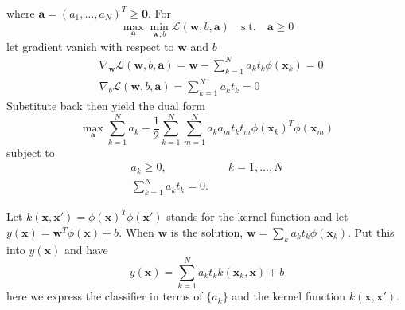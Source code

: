 \documentclass[../main.tex]{subfiles}
\begin{document}
        where $\mathbf{a}=(a_1,\dots,a_N)^T\geq \mathbf{0}$. For
        \[
            \max_{\mathbf{a}}\min_{\mathbf{w},b}\mathcal{L}(\mathbf{w},b,\mathbf{a})\mathrm{\quad s.t. \quad}\mathbf{a}\geq 0
        \]
        let gradient vanish with respect to $\mathbf{w}$ and $b$
        \begin{align*}
            &\nabla_{\mathbf{w}}\mathcal{L}(\mathbf{w},b,\mathbf{a}) = \mathbf{w}-\sum_{k=1}^N a_k t_k \phi(\mathbf{x}_k) = 0\\
            &\nabla_b \mathcal{L}(\mathbf{w},b,\mathbf{a}) = \sum_{k=1}^N a_kt_k = 0
        \end{align*}
        Substitute back then yield the dual form
        \[
            \max_{\mathbf{a}}\sum_{k=1}^N a_k - \frac{1}{2} \sum_{k=1}^N \sum_{m=1}^N a_k a_m t_k t_m \phi(\mathbf{x}_k)^T \phi(\mathbf{x}_m)
        \]
        subject to
        \begin{align*}
            a_k \geq 0,&\quad k=1,\dots,N\\
            \sum_{k=1}^N a_k t_k = 0.&
        \end{align*}
        
        Let $k(\mathbf{x},\mathbf{x}')=\phi(\mathbf{x})^T \phi(\mathbf{x}')$ stands for the kernel function and let $y(\mathbf{x}) = \mathbf{w}^T \phi(\mathbf{x}) + b$. When $\mathbf{w}$ is the solution, $\mathbf{w} = \sum_k a_k t_k \phi(\mathbf{x}_k)$. Put this into $y(\mathbf{x})$ and have
        \[
            y(\mathbf{x}) = \sum_{k=1}^N a_k t_k k(\mathbf{x}_k, \mathbf{x}) + b
        \]
        here we express the classifier in terms of $\{a_k\}$ and the kernel function $k(\mathbf{x}, \mathbf{x}')$.
        
\end{document}
